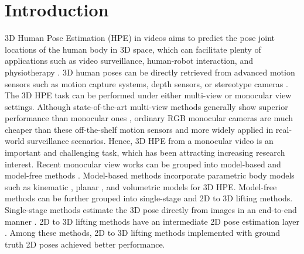 \documentclass[10pt,twocolumn,letterpaper]{article}
\begin{document}
\section{Introduction}
3D Human Pose Estimation (HPE) in videos aims to predict the pose joint locations of the human body in 3D space, which can facilitate plenty of applications such as video surveillance, human-robot interaction, and physiotherapy \cite{sarafianos20163d}. 3D human poses can be directly retrieved from advanced motion sensors such as motion capture systems, depth sensors, or stereotype cameras \cite{RN001,RN002}. The 3D HPE task can be performed under either multi-view or monocular view settings. Although state-of-the-art multi-view methods \cite{iskakov2019learnable, reddy2021tessetrack, zhang2021adafuse,he2020epipolar} generally show superior performance than monocular ones \cite{hu2021conditional,zhang2022mixste}, ordinary RGB monocular cameras are much cheaper than these off-the-shelf motion sensors and more widely applied in real-world surveillance scenarios. Hence, 3D HPE from a monocular video is an important and challenging task, which has been attracting increasing research interest. 
Recent monocular view works can be grouped into model-based and model-free methods \cite{RN007}. Model-based methods \cite{cheng20203d, gong2021poseaug} incorporate parametric body models such as kinematic \cite{RN015}, planar \cite{RN016}, and volumetric models \cite{RN017} for 3D HPE. Model-free methods can be further grouped into single-stage and 2D to 3D lifting methods. Single-stage methods estimate the 3D pose directly from images in an end-to-end manner \cite{RN008,RN010,chen2021deductive, wehrbein2021probabilistic, ma2021context, RN021}. 2D to 3D lifting methods have an intermediate 2D pose estimation layer \cite{RN011,RN012,RN013,RN014}.
Among these methods, 2D to 3D lifting methods implemented with ground truth 2D poses achieved better performance.
\end{document}
